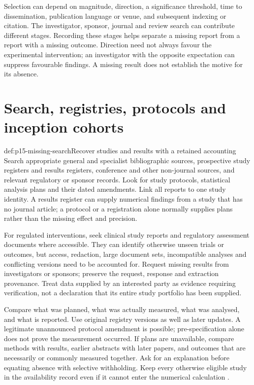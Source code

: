 Selection can depend on magnitude, direction, a significance threshold,
time to dissemination, publication language or venue, and subsequent
indexing or citation. The investigator, sponsor, journal and review
search can contribute different stages. Recording these stages helps
separate a missing report from a report with a missing outcome.
Direction need not always favour the experimental intervention; an
investigator with the opposite expectation can suppress favourable
findings. A missing result does not establish the motive for its absence.

\section{Search, registries, protocols and inception cohorts}
\label{sec:p15-missing-search}

\begin{hbmethod}{def:p15-missing-search}{Recover studies and results with a retained accounting}
Search appropriate general and specialist bibliographic sources,
prospective study registers and results registers, conference and
other non-journal sources, and relevant regulatory or sponsor records.
Look for study protocols, statistical analysis plans and their dated
amendments. Link all reports to one study identity. A results register
can supply numerical findings from a study that has no journal article;
a protocol or a registration alone normally supplies plans rather than
the missing effect and precision.

For regulated interventions, seek clinical study reports and regulatory
assessment documents where accessible. They can identify otherwise
unseen trials or outcomes, but access, redaction, large document sets,
incompatible analyses and conflicting versions need to be accounted for.
Request missing results from investigators or sponsors; preserve the
request, response and extraction provenance. Treat data supplied by an
interested party as evidence requiring verification, not a declaration
that its entire study portfolio has been supplied.

Compare what was planned, what was actually measured, what was analysed,
and what is reported. Use original registry versions as well as later
updates. A legitimate unannounced protocol amendment is possible;
pre-specification alone does not prove the measurement occurred.
If plans are unavailable, compare methods with results, earlier abstracts
with later papers, and outcomes that are necessarily or commonly
measured together. Ask for an explanation before equating absence with
selective withholding. Keep every otherwise eligible study in the
availability record even if it cannot enter the numerical calculation
\cite[secs.~13.2.1, 13.3.1.3]{PageHigginsSterne2024Cochrane13}.
\end{hbmethod}

